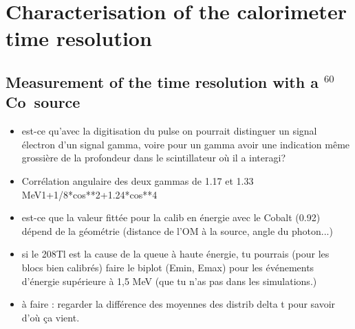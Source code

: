 \documentclass[a4paper,12pt, twoside]{memoir}   	%
\newcommand{\Co}{$^{60}$Co}
\begin{document}
               \chapter{Characterisation of the calorimeter time resolution}
               \section{Measurement of the time resolution with a \Co\ source}
               \begin{itemize}
               \item est-ce qu'avec la digitisation du pulse on pourrait distinguer un signal électron d'un signal gamma, voire pour un gamma avoir une indication même grossière de la profondeur dans le scintillateur où il a interagi?
               \item Corrélation angulaire des deux gammas de 1.17 et 1.33 MeV1+1/8*cos**2+1.24*cos**4
               \item est-ce que la valeur fittée pour la calib en énergie avec le Cobalt (0.92) dépend de la géométrie (distance de l'OM à la source, angle du photon...)
               \item si le 208Tl est la cause de la queue à haute énergie, tu pourrais (pour les blocs bien calibrés) faire le biplot (Emin, Emax) pour les événements d'énergie supérieure à 1,5 MeV (que tu n'as pas dans les simulations.)
               \item à faire : regarder la différence des moyennes des distrib delta t pour savoir d'où ça vient.
               \end{itemize}
\end{document}
